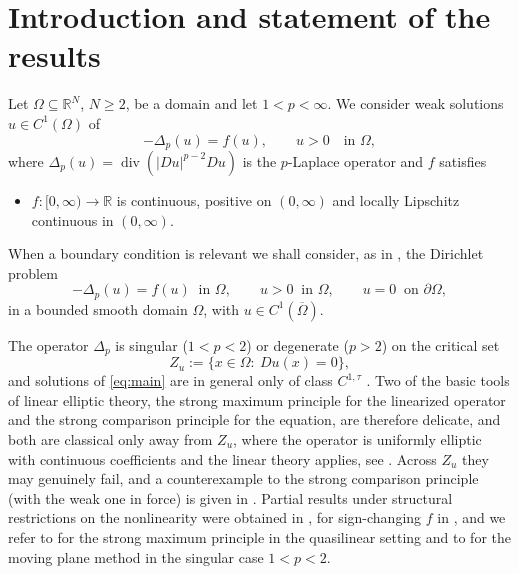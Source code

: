 \documentclass[reqno]{amsart}
\theoremstyle{plain}
\theoremstyle{definition}
\theoremstyle{remark}
\newcommand{\R}{\mathbb{R}}
\newcommand{\Lap}[1]{\Delta_{#1}}
\begin{document}
\section{Introduction and statement of the results}

Let $\Omega\subseteq\R^N$, $N\ge2$, be a domain and let $1<p<\infty$. We consider weak solutions
$u\in C^1(\Omega)$ of
\begin{equation}\label{eq:main}
-\Lap{p}(u)=f(u),\qquad u>0\quad\text{in }\Omega,
\end{equation}
where $\Lap{p}(u)=\operatorname{div}(|Du|^{p-2}Du)$ is the $p$-Laplace operator and $f$ satisfies
\begin{itemize}[leftmargin=2.2em]
\item[$(F)$] $f:[0,\infty)\to\R$ is continuous, positive on $(0,\infty)$ and locally Lipschitz
continuous in $(0,\infty)$.
\end{itemize}
When a boundary condition is relevant we shall consider, as in \cite{DS1,DS2}, the Dirichlet problem
\begin{equation}\label{eq:dirichlet}
-\Lap{p}(u)=f(u)\ \text{ in }\Omega,\qquad u>0\ \text{ in }\Omega,\qquad u=0\ \text{ on }\partial\Omega,
\end{equation}
in a bounded smooth domain $\Omega$, with $u\in C^1(\overline\Omega)$.

The operator $\Lap{p}$ is singular ($1<p<2$) or degenerate ($p>2$) on the critical set
\begin{equation}\label{eq:Z}
Z_u:=\{x\in\Omega:\ Du(x)=0\},
\end{equation}
and solutions of \eqref{eq:main} are in general only of class $C^{1,\tau}$ \cite{DiB,Tol,Lie}. Two
of the basic tools of linear elliptic theory, the strong maximum principle for the linearized
operator and the strong comparison principle for the equation, are therefore delicate, and both
are classical only away from $Z_u$, where the operator is uniformly elliptic with continuous
coefficients and the linear theory applies, see \cite{Dam1,PucciSerrin}. Across $Z_u$ they may
genuinely fail, and a counterexample to the strong comparison principle (with
the weak one in force) is given in \cite{CT}. Partial results under structural restrictions on the
nonlinearity were obtained in \cite{CT,LP}, for sign-changing $f$ in \cite{RS}, and we refer to
\cite{Vaz} for the strong maximum principle in the quasilinear setting and to \cite{DamPac}
for the moving plane method in the singular case $1<p<2$.
\end{document}
